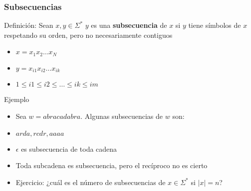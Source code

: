 \begin{frame}
  \frametitle{Subsecuencias}
      \begin{block}{Definición: Sean $x, y \in \Sigma^*$}
			$y$ es una \textbf{subsecuencia} de $x$ si $y$ tiene símbolos de $x$ respetando su orden, pero no necesariamente contiguos
      \end{block}
      \pause

      \begin{block}{}
           \begin{itemize}[<+->]
           \item $x = x_1x_2 \ldots x_N$
					 \item $y = x_{i1} x_{i2} \ldots x_{ik}$
					 \item $1 \leq i1 \leq i2 \leq \ldots \leq ik \leq im$
           \end{itemize}
			\end{block}

      \pause
      \begin{block}{Ejemplo}
           \begin{itemize}[<+->]
           \item Sea $w = abracadabra$. Algunas subsecuencias de $w$ son:
					 \item $arda, rcdr, aaaa$
					 \item $\epsilon$ es subsecuencia de toda cadena
			     \item Toda subcadena es subsecuencia, pero el recíproco no es cierto
			     \item Ejercicio: ¿cuál es el número de subsecuencias de $x \in \Sigma^*$ si $|x|=n$?
           \end{itemize}
			\end{block}
\end{frame}
